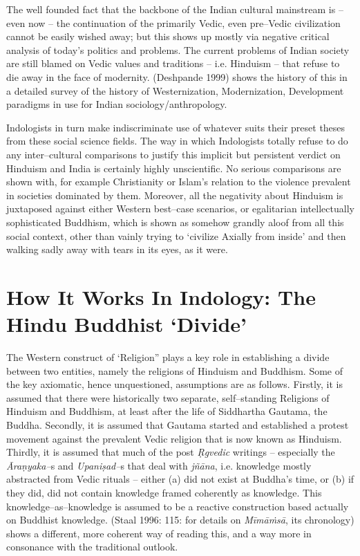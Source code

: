 The well founded fact that the backbone of the Indian cultural mainstream is – even now – the continuation of the primarily Vedic, even pre–Vedic civilization cannot be easily wished away; but this shows up mostly via negative critical analysis of today’s politics and problems. The current problems of Indian society are still blamed on Vedic values and traditions – i.e. Hinduism – that refuse to die away in the face of modernity. (Deshpande 1999) shows the history of this in a detailed survey of the history of Westernization, Modernization, Development paradigms in use for Indian sociology/anthropology.

Indologists in turn make indiscriminate use of whatever suits their preset theses from these social science fields. The way in which Indologists totally refuse to do any inter–cultural comparisons to justify this implicit but persistent verdict on Hinduism and India is certainly highly unscientific. No serious comparisons are shown with, for example Christianity or Islam’s relation to the violence prevalent in societies dominated by them. Moreover, all the negativity about Hinduism is juxtaposed against either Western best–case scenarios, or egalitarian intellectually sophisticated Buddhism, which is shown as somehow grandly aloof from all this social context, other than vainly trying to ‘civilize Axially from inside’ and then walking sadly away with tears in its eyes, as it were.


\section*{How It Works In Indology: The Hindu Buddhist ‘Divide’}

The Western construct of ‘Religion” plays a key role in establishing a divide between two entities, namely the religions of Hinduism and Buddhism. Some of the key axiomatic, hence unquestioned, assumptions are as follows. Firstly, it is assumed that there were historically two separate, self–standing Religions of Hinduism and Buddhism, at least after the life of Siddhartha Gautama, the Buddha. Secondly, it is assumed that Gautama started and established a protest movement against the prevalent Vedic religion that is now known as Hinduism. Thirdly, it is assumed that much of the post \textit{Ṛgvedic} writings – especially the \textit{Āraṇyaka–}s and \textit{Upaniṣad–}s that deal with \textit{jñāna}, i.e. knowledge mostly abstracted from Vedic rituals – either (a) did not exist at Buddha’s time, or (b) if they did, did not contain knowledge framed coherently as knowledge. This knowledge–as–knowledge is assumed to be a reactive construction based actually on Buddhist knowledge. (Staal 1996: 115: for details on \textit{Mīmāṁsā}, its chronology) shows a different, more coherent way of reading this, and a way more in consonance with the traditional outlook.

